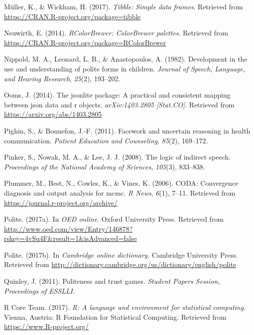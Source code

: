 \documentclass[oneside]{report}
\begin{document}
\hypertarget{ref-R-tibble}{}
Müller, K., \& Wickham, H. (2017). \emph{Tibble: Simple data frames}.
Retrieved from \url{https://CRAN.R-project.org/package=tibble}

\hypertarget{ref-R-RColorBrewer}{}
Neuwirth, E. (2014). \emph{RColorBrewer: ColorBrewer palettes}.
Retrieved from \url{https://CRAN.R-project.org/package=RColorBrewer}

\hypertarget{ref-nippold1982}{}
Nippold, M. A., Leonard, L. B., \& Anastopoulos, A. (1982). Development
in the use and understanding of polite forms in children. \emph{Journal
of Speech, Language, and Hearing Research}, \emph{25}(2), 193--202.

\hypertarget{ref-R-jsonlite}{}
Ooms, J. (2014). The jsonlite package: A practical and consistent
mapping between json data and r objects. \emph{arXiv:1403.2805
{[}Stat.CO{]}}. Retrieved from \url{https://arxiv.org/abs/1403.2805}

\hypertarget{ref-pighin2011}{}
Pighin, S., \& Bonnefon, J.-F. (2011). Facework and uncertain reasoning
in health communication. \emph{Patient Education and Counseling},
\emph{85}(2), 169--172.

\hypertarget{ref-pinker2008}{}
Pinker, S., Nowak, M. A., \& Lee, J. J. (2008). The logic of indirect
speech. \emph{Proceedings of the National Academy of Sciences},
\emph{105}(3), 833--838.

\hypertarget{ref-R-coda}{}
Plummer, M., Best, N., Cowles, K., \& Vines, K. (2006). CODA:
Convergence diagnosis and output analysis for mcmc. \emph{R News},
\emph{6}(1), 7--11. Retrieved from
\url{https://journal.r-project.org/archive/}

\hypertarget{ref-oxfordPolite}{}
Polite. (2017a). In \emph{OED online}. Oxford University Press.
Retrieved from
\url{http://www.oed.com/view/Entry/146878?rskey=4vSu4F\&result=1\&isAdvanced=false}

\hypertarget{ref-cambridgePolite}{}
Polite. (2017b). In \emph{Cambridge online dictionary}. Cambridge
University Press. Retrieved from
\url{http://dictionary.cambridge.org/us/dictionary/english/polite}

\hypertarget{ref-quinley2011}{}
Quinley, J. (2011). Politeness and trust games. \emph{Student Papers
Session, Proceedings of ESSLLI}.

\hypertarget{ref-R-base}{}
R Core Team. (2017). \emph{R: A language and environment for statistical
computing}. Vienna, Austria: R Foundation for Statistical Computing.
Retrieved from \url{https://www.R-project.org/}
\end{document}
